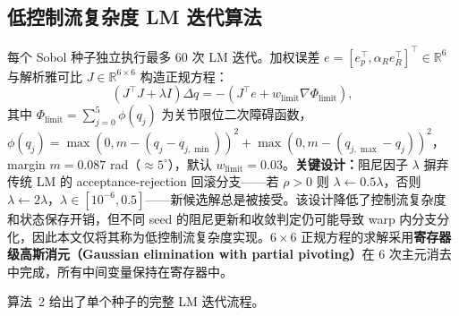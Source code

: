 \documentclass[twocolumn,a4paper,10pt]{ctexart}
\newcommand{\R}{\mathbb{R}}
\begin{document}
\subsection{低控制流复杂度 LM 迭代算法}

每个 Sobol 种子独立执行最多 60 次 LM 迭代\cite{levenberg1944,marquardt1963}。加权误差 $e=[e_p^\top,\alpha_R e_R^\top]^\top\in\R^6$ 与解析雅可比 $J\in\R^{6\times6}$ 构造正规方程：
\begin{equation}
(J^\top J+\lambda I)\Delta q=-(J^\top e+w_{\mathrm{limit}}\nabla\Phi_{\mathrm{limit}}),
\end{equation}
其中 $\Phi_{\mathrm{limit}}=\sum_{j=0}^5\phi(q_j)$ 为关节限位二次障碍函数，$\phi(q_j)=\max(0,m-(q_j-q_{j,\min}))^2+\max(0,m-(q_{j,\max}-q_j))^2$，margin $m=0.087$ rad（$\approx5^\circ$），默认 $w_{\mathrm{limit}}=0.03$。\textbf{关键设计：}阻尼因子 $\lambda$ 摒弃传统 LM 的 acceptance-rejection 回滚分支——若 $\rho>0$ 则 $\lambda\leftarrow0.5\lambda$，否则 $\lambda\leftarrow2\lambda$，$\lambda\in[10^{-6},0.5]$——新候选解总是被接受。该设计降低了控制流复杂度和状态保存开销，但不同 seed 的阻尼更新和收敛判定仍可能导致 warp 内分支分化，因此本文仅将其称为低控制流复杂度实现。$6\times6$ 正规方程的求解采用\textbf{寄存器级高斯消元（Gaussian elimination with partial pivoting）}在 6 次主元消去中完成，所有中间变量保持在寄存器中。

算法~2 给出了单个种子的完整 LM 迭代流程。
\end{document}
